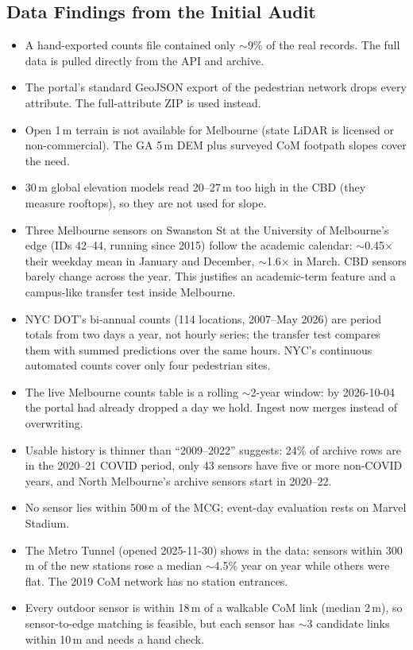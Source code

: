 \documentclass[11pt]{article}
\begin{document}
\subsection{Data Findings from the Initial Audit}
\begin{itemize}
  \item A hand-exported counts file contained only $\sim$9\% of the real records. The full data is pulled directly from the API and archive.
  \item The portal's standard GeoJSON export of the pedestrian network drops every attribute. The full-attribute ZIP is used instead.
  \item Open 1\,m terrain is not available for Melbourne (state LiDAR is licensed or non-commercial). The GA 5\,m DEM plus surveyed CoM footpath slopes cover the need.
  \item 30\,m global elevation models read 20--27\,m too high in the CBD (they measure rooftops), so they are not used for slope.
  \item Three Melbourne sensors on Swanston St at the University of Melbourne's edge (IDs 42--44, running since 2015) follow the academic calendar: $\sim$0.45$\times$ their weekday mean in January and December, $\sim$1.6$\times$ in March. CBD sensors barely change across the year. This justifies an academic-term feature and a campus-like transfer test inside Melbourne.
  \item NYC DOT's bi-annual counts (114 locations, 2007--May 2026) are period totals from two days a year, not hourly series; the transfer test compares them with summed predictions over the same hours. NYC's continuous automated counts cover only four pedestrian sites.
  \item The live Melbourne counts table is a rolling $\sim$2-year window: by 2026-10-04 the portal had already dropped a day we hold. Ingest now merges instead of overwriting.
  \item Usable history is thinner than ``2009--2022'' suggests: 24\% of archive rows are in the 2020--21 COVID period, only 43 sensors have five or more non-COVID years, and North Melbourne's archive sensors start in 2020--22.
  \item No sensor lies within 500\,m of the MCG; event-day evaluation rests on Marvel Stadium.
  \item The Metro Tunnel (opened 2025-11-30) shows in the data: sensors within 300\,m of the new stations rose a median $\sim$4.5\% year on year while others were flat. The 2019 CoM network has no station entrances.
  \item Every outdoor sensor is within 18\,m of a walkable CoM link (median 2\,m), so sensor-to-edge matching is feasible, but each sensor has $\sim$3 candidate links within 10\,m and needs a hand check.

\end{itemize}
\end{document}

